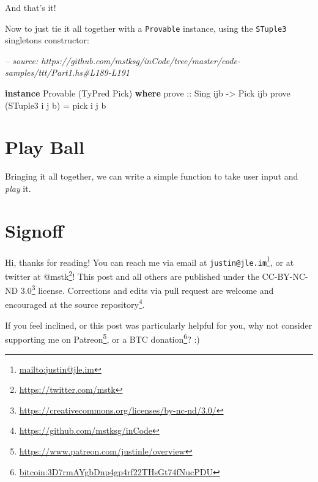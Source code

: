 \documentclass[]{article}
\newenvironment{Shaded}{}{}
\newcommand{\CommentTok}[1]{\textcolor[rgb]{0.38,0.63,0.69}{\textit{#1}}}
\newcommand{\DataTypeTok}[1]{\textcolor[rgb]{0.56,0.13,0.00}{#1}}
\newcommand{\FunctionTok}[1]{\textcolor[rgb]{0.02,0.16,0.49}{#1}}
\newcommand{\KeywordTok}[1]{\textcolor[rgb]{0.00,0.44,0.13}{\textbf{#1}}}
\newcommand{\NormalTok}[1]{#1}
\newcommand{\OtherTok}[1]{\textcolor[rgb]{0.00,0.44,0.13}{#1}}
\renewcommand{\href}[2]{#2\footnote{\url{#1}}}
\begin{document}
And that's it!

Now to just tie it all together with a \texttt{Provable} instance, using the
\texttt{STuple3} singletons constructor:

\begin{Shaded}
\begin{Highlighting}[]
\CommentTok{-- source: https://github.com/mstksg/inCode/tree/master/code-samples/ttt/Part1.hs#L189-L191}

\KeywordTok{instance} \DataTypeTok{Provable}\NormalTok{ (}\DataTypeTok{TyPred} \DataTypeTok{Pick}\NormalTok{) }\KeywordTok{where}
\OtherTok{    prove ::} \DataTypeTok{Sing}\NormalTok{ ijb }\OtherTok{->} \DataTypeTok{Pick}\NormalTok{ ijb}
\NormalTok{    prove (}\DataTypeTok{STuple3}\NormalTok{ i j b) }\FunctionTok{=}\NormalTok{ pick i j b}
\end{Highlighting}
\end{Shaded}

\hypertarget{play-ball}{%
\section{Play Ball}\label{play-ball}}

Bringing it all together, we can write a simple function to take user input and
\emph{play} it.

\hypertarget{signoff}{%
\section{Signoff}\label{signoff}}

Hi, thanks for reading! You can reach me via email at
\href{mailto:justin@jle.im}{\nolinkurl{justin@jle.im}}, or at twitter at
\href{https://twitter.com/mstk}{@mstk}! This post and all others are published
under the \href{https://creativecommons.org/licenses/by-nc-nd/3.0/}{CC-BY-NC-ND
3.0} license. Corrections and edits via pull request are welcome and encouraged
at \href{https://github.com/mstksg/inCode}{the source repository}.

If you feel inclined, or this post was particularly helpful for you, why not
consider \href{https://www.patreon.com/justinle/overview}{supporting me on
Patreon}, or a \href{bitcoin:3D7rmAYgbDnp4gp4rf22THsGt74fNucPDU}{BTC donation}?
:)
\end{document}

